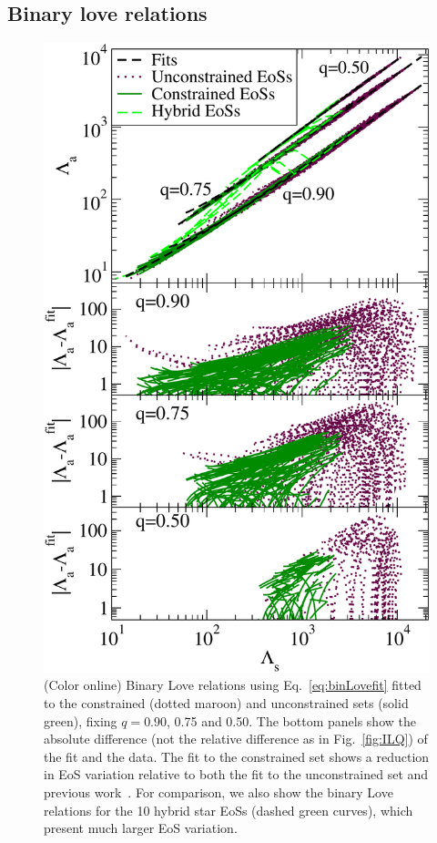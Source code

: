 \documentclass[prd,twocolumn,nofootinbib,superscriptaddress,amsmath,amssymb]{revtex4-1}
\begin{document}

\subsection{Binary love relations}
\label{sec:binary}

\begin{figure}[htb]
\begin{center} 
\includegraphics[width=\columnwidth]{binLoveAbsolute.pdf}
\end{center}
\caption{(Color online) Binary Love relations using Eq.~\eqref{eq:binLovefit} fitted to the constrained (dotted maroon) and unconstrained sets (solid green), fixing $q=0.90$, 0.75 and 0.50. The bottom panels show the absolute difference (not the relative difference as in Fig.~\ref{fig:ILQ}) of the fit and the data. The fit to the constrained set shows a reduction in EoS variation relative to both the fit to the unconstrained set and previous work~\cite{Yagi:binLove}. For comparison, we also show the binary Love relations for the 10 hybrid star EoSs (dashed green curves), which present much larger EoS variation. 
}
\label{fig:binLove}
\end{figure} 
\end{document}
